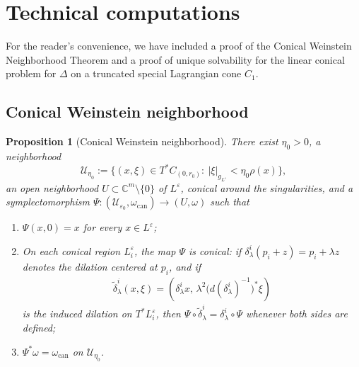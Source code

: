 \documentclass[11pt]{amsart}
\newtheorem{proposition}{Proposition}
\theoremstyle{definition}
\theoremstyle{remark}
\newcommand{\C}{\mathbb{C}}
\begin{document}
\appendix
\section{Technical computations}
For the reader's convenience, we have included a proof of the Conical Weinstein Neighborhood Theorem and a proof of unique solvability for the linear conical problem for $\Delta$ on a truncated special Lagrangian cone $C_1$.
\subsection{Conical Weinstein neighborhood}
\begin{proposition}[Conical Weinstein neighborhood]\label{prop:weinstein-approximate-solutions}
There exist $\eta_0>0$, a neighborhood 
\[
\mathcal{U}_{\eta_0} := \{(x,\xi)\in T^\ast C_{(0,r_0)}:\ |\xi|_{g_{L^\varepsilon}}<\eta_0 \rho(x)\},
\]
an open neighborhood $U\subset \C^m\setminus\{0\}$ of $L^\varepsilon$, conical around the singularities, and a symplectomorphism $\Psi:(\mathcal{U}_{\varepsilon_0},\omega_{\mathrm{can}})\to (U,\omega)$
such that\begin{enumerate}
\item \(\Psi(x,0)=x\) for every \(x\in L^\varepsilon\);

\item On each conical region \(L^\varepsilon_i\), the map \(\Psi\) is conical:
if \(\delta^i_\lambda(p_i+z)=p_i+\lambda z\) denotes the dilation centered at
\(p_i\), and if
\begin{align*}
\widetilde\delta^i_\lambda(x,\xi)
=
\left(
\delta^i_\lambda x,\,
\lambda^2 \bigl(d(\delta^i_\lambda)^{-1}\bigr)^*\xi
\right)
\end{align*}
is the induced dilation on \(T^*L^\varepsilon_i\), then $\Psi\circ \widetilde \delta^i_\lambda
=
\delta^i_\lambda\circ \Psi$
whenever both sides are defined;

\item \(\Psi^*\omega=\omega_{\mathrm{can}}\) on \(\mathcal U_{\eta_0}\).
\end{enumerate}
\end{proposition}
\end{document}
